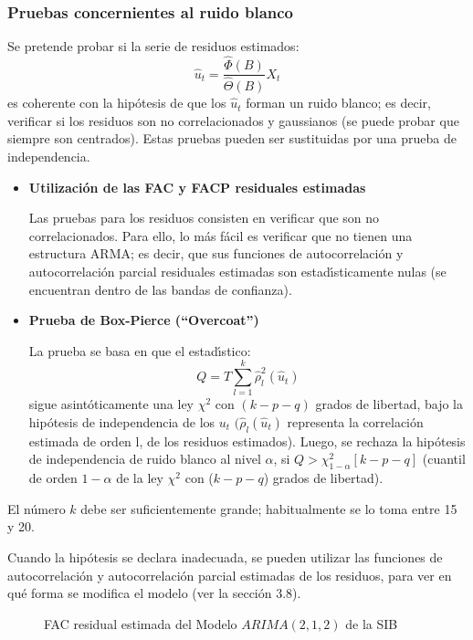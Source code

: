 \subsubsection{Pruebas concernientes al ruido blanco}

Se pretende probar si la serie de residuos estimados:
\[
\widehat{u}_{t}=\frac{\widehat{\Phi }(B)}{\widehat{\Theta }(B)}X_{t}
\]
es coherente con la hip\'{o}tesis de que los $\widehat{u}_{t}$ forman un ruido 
blanco; es decir, verificar si los residuos son no correlacionados y 
gaussianos (se puede probar que siempre son centrados). Estas pruebas pueden 
ser sustituidas por una prueba de independencia. 

\begin{itemize}
 \item \textbf{Utilizaci\'{o}n de las FAC y FACP residuales estimadas}
 
 Las pruebas para los residuos consisten en verificar que son no correlacionados. Para ello, lo m\'{a}s f\'{a}cil es verificar que no tienen una estructura ARMA; es decir, que sus funciones de autocorrelaci\'{o}n y autocorrelaci\'{o}n parcial residuales estimadas son estad\'{\i}sticamente nulas (se encuentran dentro de las bandas de confianza). 

  \item \textbf{Prueba de Box-Pierce (``Overcoat'')}
  
  La prueba se basa en que el estad\'{\i}stico:
 \[
 Q=T\sum_{l=1}^k {\widehat{\rho }_{l}^{2}\left( \widehat{u}_{t} \right)} 
 \]
 sigue asint\'{o}ticamente una ley $\chi^{2}$ con $(k-p-q)$ grados de libertad, bajo la hip\'{o}tesis de independencia de los $u_{t}$ $(\widehat{\rho }_{l}\left( \widehat{u}_{t} \right)$ representa la correlaci\'{o}n estimada de orden l, de los residuos estimados). Luego, se rechaza la hip\'{o}tesis de independencia de ruido blanco al nivel $\alpha $, si $Q>\chi_{1-\alpha }^{2}[k-p-q]$ (cuantil de orden $1-\alpha $ de la ley $\chi^{2}$ con ($k-p-q$) grados de libertad).
\end{itemize}

El n\'{u}mero $k$ debe ser suficientemente grande; habitualmente se lo toma 
entre 15 y 20. 

Cuando la hip\'{o}tesis se declara inadecuada, se pueden utilizar las 
funciones de autocorrelaci\'{o}n y autocorrelaci\'{o}n parcial estimadas de 
los residuos, para ver en qu\'{e} forma se modifica el modelo (ver la 
secci\'{o}n 3.8).

\begin{figure}[H]
\centering
\caption{FAC residual estimada del Modelo $ARIMA(2,1,2)$ de la SIB}
\end{figure}


